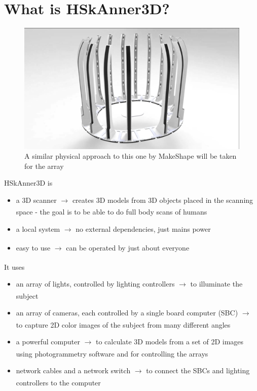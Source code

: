 \section{What is HSkAnner3D?}
    \begin{figure}[H]
        \centerline{\includegraphics[width=\linewidth]{what/korean_scanner.png}}
        \caption{A similar physical approach to this one by MakeShape \cite{scanner_korean} will be taken for the array}
    \label{korean}
    \end{figure}

    HSkAnner3D is
    \begin{itemize}
        \item a 3D scanner $\xrightarrow[]{}$ creates 3D models from 3D objects placed in the scanning space - the goal is to be able to do full body scans of humans
        \item a local system $\xrightarrow[]{}$ no external dependencies, just mains power
        \item easy to use $\xrightarrow[]{}$ can be operated by just about everyone
    \end{itemize}
    
    It uses
    \begin{itemize}
        \item an array of lights, controlled by lighting controllers $\xrightarrow[]{}$ to illuminate the subject
        \item an array of cameras, each controlled by a single board computer (SBC) $\xrightarrow[]{}$ to capture 2D color images of the subject from many different angles
        \item a powerful computer $\xrightarrow[]{}$ to calculate 3D models from a set of 2D images using photogrammetry software and for controlling the arrays
        \item network cables and a network switch $\xrightarrow[]{}$ to connect the SBCs and lighting controllers to the computer
    \end{itemize}
    

